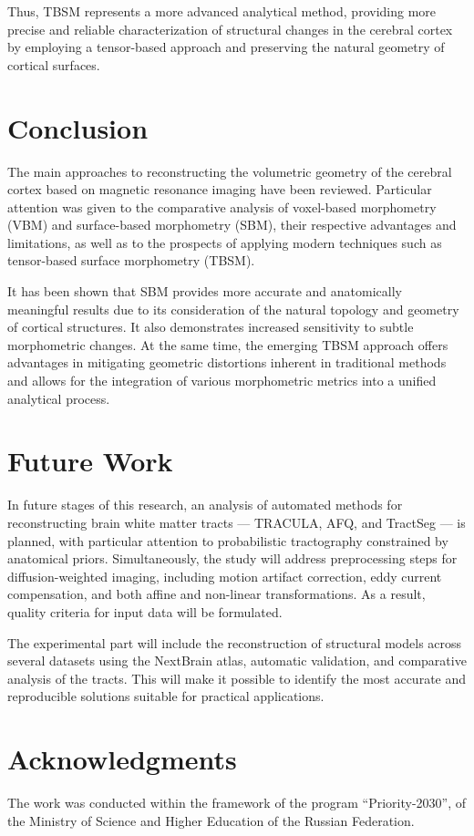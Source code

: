 \documentclass[default]{subfiles}
\begin{document}
Thus, TBSM represents a more advanced analytical method, providing more precise and reliable characterization of
structural changes in the cerebral cortex by employing a tensor-based approach and preserving the natural geometry
of cortical surfaces.

\section{Conclusion}

The main approaches to reconstructing the volumetric geometry of the cerebral cortex based on magnetic resonance
imaging have been reviewed. Particular attention was given to the comparative analysis of voxel-based morphometry
(VBM) and surface-based morphometry (SBM), their respective advantages and limitations, as well as to the prospects
of applying modern techniques such as tensor-based surface morphometry (TBSM).

It has been shown that SBM provides more accurate and anatomically meaningful results due to its consideration of
the natural topology and geometry of cortical structures. It also demonstrates increased sensitivity to subtle
morphometric changes. At the same time, the emerging TBSM approach offers advantages in mitigating geometric
distortions inherent in traditional methods and allows for the integration of various morphometric metrics into a
unified analytical process.

\section{Future Work}

In future stages of this research, an analysis of automated methods for reconstructing brain white matter tracts —
TRACULA, AFQ, and TractSeg — is planned, with particular attention to probabilistic tractography constrained by
anatomical priors. Simultaneously, the study will address preprocessing steps for diffusion-weighted imaging, including
motion artifact correction, eddy current compensation, and both affine and non-linear transformations. As a result,
quality criteria for input data will be formulated.

The experimental part will include the reconstruction of structural models across several datasets using the NextBrain
atlas, automatic validation, and comparative analysis of the tracts. This will make it possible to identify the most
accurate and reproducible solutions suitable for practical applications.


\section{Acknowledgments}
\begin{funding}
  The work was conducted within the framework of the program “Priority-2030”, of the Ministry of Science and Higher
  Education of the Russian Federation.
\end{funding}

\putbib[cite]

\makealttitle
\end{document}
